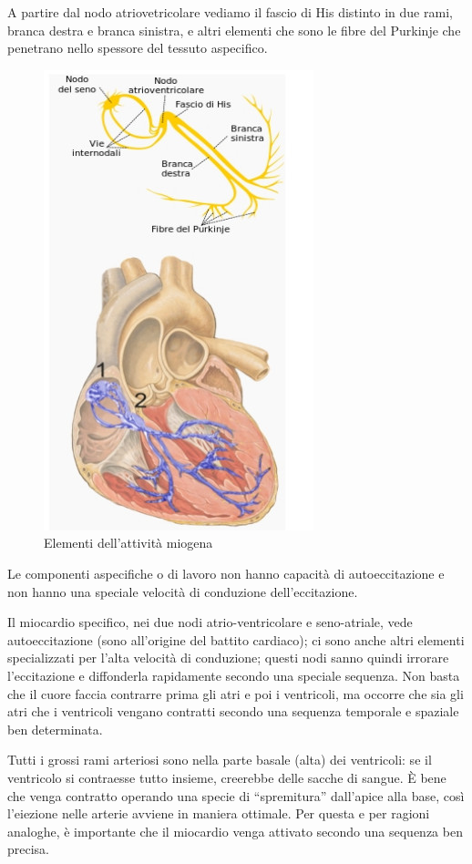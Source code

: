 \documentclass[a4paper,12pt]{article}
\begin{document}
A partire dal nodo atriovetricolare vediamo il fascio di His distinto in due rami, branca destra e branca sinistra, e altri elementi che sono le fibre del Purkinje che penetrano nello spessore del tessuto aspecifico.
\begin{figure}[H]
\centering
\includegraphics[scale=0.5]{immagine/nodi.jpg}
\caption{Elementi dell'attività miogena}
\end{figure}
Le componenti aspecifiche o di lavoro non hanno capacità di autoeccitazione e non hanno una speciale velocità di conduzione dell'eccitazione.

Il miocardio specifico, nei due nodi atrio-ventricolare e seno-atriale, vede autoeccitazione (sono all'origine del battito cardiaco); ci sono anche altri elementi specializzati per l'alta velocità di conduzione; questi nodi sanno quindi irrorare l'eccitazione e diffonderla rapidamente secondo una speciale sequenza. Non basta che il cuore faccia contrarre prima gli atri e poi i ventricoli, ma occorre che sia gli atri che i ventricoli vengano contratti secondo una sequenza temporale e spaziale ben determinata.

Tutti i grossi rami arteriosi sono nella parte basale (alta) dei ventricoli: se il ventricolo si contraesse tutto insieme, creerebbe delle sacche di sangue. È bene che venga contratto operando una specie di “spremitura” dall'apice alla base, così l'eiezione nelle arterie avviene in maniera ottimale. Per questa e per ragioni analoghe, è importante che il miocardio venga attivato secondo una sequenza ben precisa.
\end{document}
